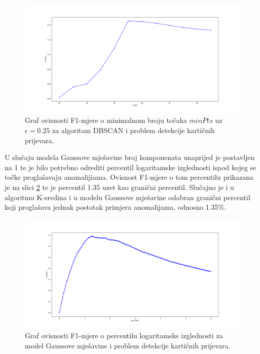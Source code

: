 \documentclass[utf8, diplomski, numeric]{fer}
\begin{document}
\begin{figure}[h!]
\includegraphics[width=1\textwidth]{images/credit-dbscan-f1.png}
\centering
\caption{Graf ovisnosti F1-mjere o minimalnom broju točaka $minPts$ uz $\epsilon = 0.25$ za algoritam DBSCAN i problem detekcije kartičnih prijevara.}
\label{fig:credit-dbscan}
\end{figure}

U slučaju modela Gaussove mješavine broj komponenata unaprijed je postavljen na 1 te je bilo potrebno odrediti percentil logaritamske izglednosti ispod kojeg se točke proglašavaju anomalijiama. Ovisnost F1-mjere o tom percentilu prikazana je na slici \ref{fig:credit-gauss} te je percentil 1.35 uzet kao granični percentil. Slučajno je i u algoritmu K-sredina i u modelu Gaussove mješavine odabran granični percentil koji proglašava jednak postotak primjera anomalijama, odnosno 1.35\%.

\begin{figure}[h!]
\includegraphics[width=1\textwidth]{images/credit-gauss-f1.png}
\centering
\caption{Graf ovisnosti F1-mjere o percentilu logaritamske izglednosti za model Gaussove mješavine i problem detekcije kartičnih prijevara.}
\label{fig:credit-gauss}
\end{figure}
\end{document}
